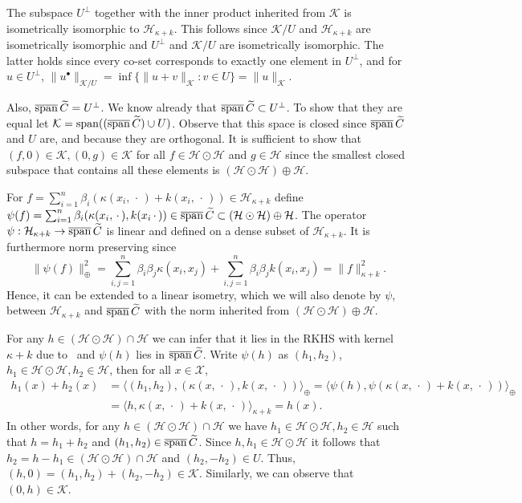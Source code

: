 \documentclass[10pt]{amsart}
\theoremstyle{definition}\newtheorem{defi}[theo]{Definition}\newtheorem{rema}[theo]{Remark}\newtheorem{exam}[theo]{Example}\newtheorem{exem}[theo]{Example}\newtheorem{nota}[theo]{Notation}
\theoremstyle{remark}
\DeclareMathOperator{\spn}{span}
\DeclareMathOperator{\cspn}{\overline{span}}
\newcommand{\X}{\mathcal{X}}
\newcommand{\cH}{\mathcal{H}}
\newcommand{\clK}{\mathcal{K}}
\let\oldtilde\tilde
\renewcommand*{\tilde}[1]{\mathchoice{\widetilde{#1}}{\widetilde{#1}}{\oldtilde{#1}}{\oldtilde{#1}}}
\renewcommand*{\to}{\mathchoice{\longrightarrow}{\rightarrow}{\rightarrow}{\rightarrow}}
\begin{document}
The subspace $U^\perp$ together with the inner product inherited from $\clK$ is isometrically isomorphic to $\cH_{\kappa + k}$. This follows since $\clK/U$ and $\cH_{\kappa+k}$ are isometrically isomorphic and $U^\perp$ and $\clK/U$ are isometrically isomorphic. The latter holds since every co-set corresponds to exactly one element in $U^\perp$, and for $u \in U^\perp$, $\|u^\bullet\|_{\clK/U} = \inf\{\|u + v\|_\clK :v \in U\}= \|u\|_\clK$.

Also, $\cspn \tilde C = U^\perp$. We know already that $\cspn \tilde C \subset U^\perp$. To show that they are equal let $ \clK = \spn ((\cspn \tilde C) \cup U)$. Observe that this space is closed since $\cspn \tilde C$ and $U$ are, and because they are orthogonal. It is sufficient to show that $(f,0) \in \clK, (0,g) \in \clK$ for all $f \in \cH \odot\cH$ and $g \in \cH$ since the smallest closed subspace that contains all these elements is $(\cH \odot \cH) \oplus \cH$.

For $f = \sum_{i=1}^n \beta_i (\kappa(x_i,\,\cdot\,) + k(x_i,\,\cdot\,))\in \cH_{\kappa +k}$ define $\psi(f) = \sum_{i=1}^n \beta_i (\kappa(x_i,\,\cdot\,),\linebreak k(x_i\,\cdot\,)) \in \cspn \tilde C \subset (\cH \odot \cH) \oplus \cH$. The operator $\psi: \cH_{\kappa +k} \to \cspn \tilde C$ is linear and defined on a dense subset of $\cH_{\kappa + k}$. It is furthermore norm preserving since
\[
\| \psi(f) \|^2_\oplus = \sum_{i,j=1}^n \beta_i \beta_j \kappa(x_i,x_j) + \sum_{i,j=1}^n \beta_i \beta_j k(x_i,x_j) = \|f\|_{\kappa +k}^2.
\]
Hence, it can be extended to a linear isometry, which we will also denote by $\psi$, between $\cH_{\kappa + k}$ and $\cspn \tilde C$ with the norm inherited from $(\cH \odot \cH) \oplus \cH$.

For any $h\in (\cH \odot \cH) \cap \cH$ we can infer that it lies in the RKHS with kernel $\kappa + k$ due to~\cite[Theorem, p.~353]{ARON50} and $\psi(h)$ lies in $\cspn \tilde C$. Write $\psi(h)$ as $(h_1, h_2)$, $h_1 \in \cH \odot \cH, h_2 \in \cH$, then for all $x\in \X$,
\begin{align*}
h_1(x) + h_2(x) &= \bigl\langle (h_1,h_2), (\kappa(x,\,\cdot\,), k(x,\,\cdot\,)) \bigr\rangle_\oplus = \bigl\langle \psi(h), \psi(\kappa(x,\,\cdot\,) + k(x,\,\cdot\,)) \bigr\rangle_\oplus \\
&= \bigl\langle h,\kappa(x,\,\cdot\,) + k(x,\,\cdot\,) \bigr\rangle_{\kappa +k} = h(x).
\end{align*}
In other words, for any $h\in (\cH \odot \cH)\cap \cH$ we have $h_1 \in \cH \odot \cH, h_2 \in \cH$ such that $h= h_1 + h_2$ and $(h_1,h_2) \in \cspn \tilde C$. Since $h,h_1 \in \cH \odot \cH$ it follows that $h_2 = h - h_1 \in (\cH \odot \cH) \cap \cH$ and $(h_2, -h_2) \in U$. Thus, $(h,0) = (h_1,h_2) + (h_2,-h_2) \in \clK$. Similarly, we can observe that $(0,h) \in \clK$.
\end{document}
